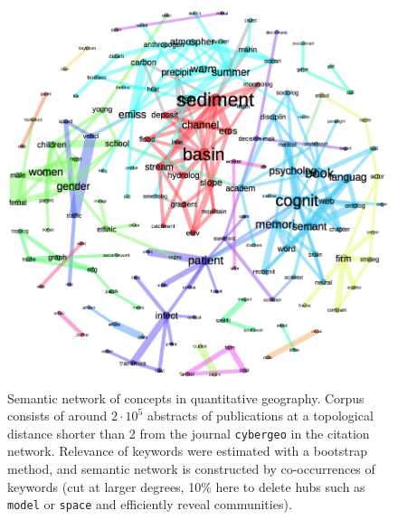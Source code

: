 \begin{figure}
\hspace{-2cm}
\includegraphics[width=1.4\textwidth]{Figures/PartI/QuantitativeEpistemo/HyperNetwork/all_lesslinks}
\caption[Semantic network of concepts in quantitative geography]{Semantic network of concepts in quantitative geography. Corpus consists of around $2\cdot 10^5$ abstracts of publications at a topological distance shorter than 2 from the journal \texttt{cybergeo} in the citation network. Relevance of keywords were estimated with a bootstrap method, and semantic network is constructed by co-occurrences of keywords (cut at larger degrees, 10\% here to delete hubs such as \texttt{model} or \texttt{space} and efficiently reveal communities).}
\label{fig:quantepistemo:semanticnw}
\end{figure}










